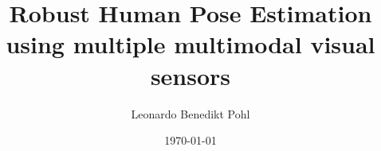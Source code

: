 \title[Robust Human Pose Estimation using multiple multimodal visual sensors]{Robust Human Pose Estimation using multiple multimodal visual sensors}


\author{Leonardo Benedikt Pohl}

\date{\today}


\begin{abstract}
    
  

\end{abstract}
